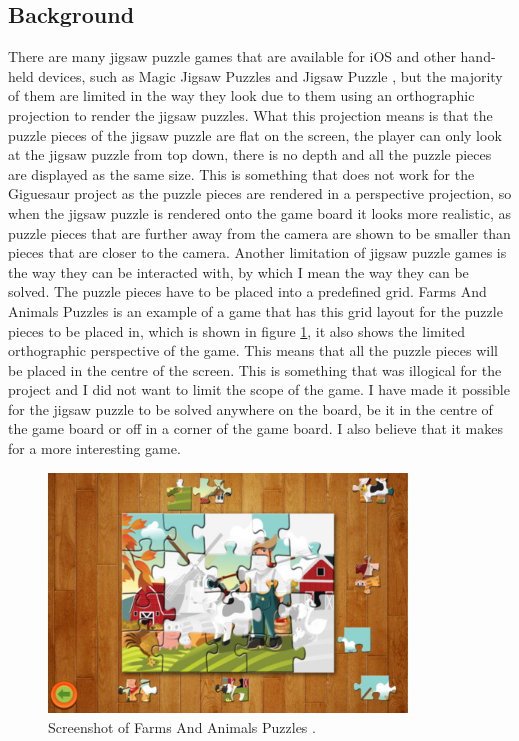 \documentclass{article}
\begin{document}
\subsection{Background}
There are many jigsaw puzzle games that are available for iOS and other hand-held devices, such as Magic Jigsaw Puzzles \cite{ref:MagicJigsaw} and Jigsaw Puzzle \cite{ref:JigsawPuzzle}, but the majority of them are limited in the way they look due to them using an orthographic projection to render the jigsaw puzzles. What this projection means is that the puzzle pieces of the jigsaw puzzle are flat on the screen, the player can only look at the jigsaw puzzle from top down, there is no depth and all the puzzle pieces are displayed as the same size. This is something that does not work for the Giguesaur project as the puzzle pieces are rendered in a perspective projection, so when the jigsaw puzzle is rendered onto the game board it looks more realistic, as puzzle pieces that are further away from the camera are shown to be smaller than pieces that are closer to the camera. Another limitation of jigsaw puzzle games is the way they can be interacted with, by which I mean the way they can be solved. The puzzle pieces have to be placed into a predefined grid. Farms And Animals Puzzles \cite{ref:FarmPuzzle} is an example of a game that has this grid layout for the puzzle pieces to be placed in, which is shown in figure \ref{fig:FarmsAnimals}, it also shows the limited orthographic perspective of the game. This means that all the puzzle pieces will be placed in the centre of the screen. This is something that was illogical for the project and I did not want to limit the scope of the game. I have made it possible for the jigsaw puzzle to be solved anywhere on the board, be it in the centre of the game board or off in a corner of the game board. I also believe that it makes for a more interesting game.

\begin{figure}[h]
\begin{center}
\includegraphics[width=0.85\textwidth]{images/FarmAnimalsJigsawImage}
\caption{Screenshot of Farms And Animals Puzzles \cite{img:FarmPuzzle}.}
\label{fig:FarmsAnimals}
\end{center}
\end{figure}
\end{document}
